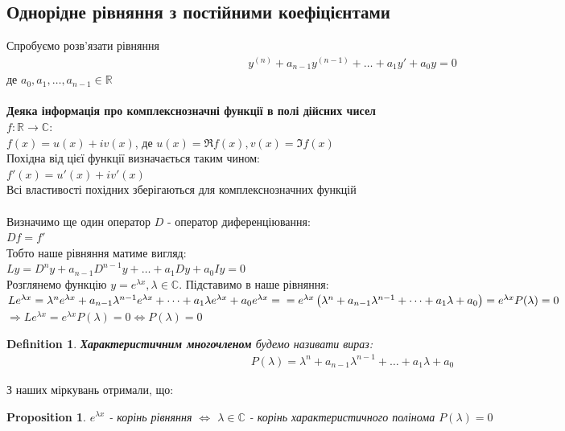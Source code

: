 \documentclass[a4paper, 10pt]{article}
\theoremstyle{theoremdd}
\theoremstyle{theoremdd}
\newtheorem{definition}[theorem]{Definition}
\theoremstyle{theoremdd}
\theoremstyle{theoremdd}
\theoremstyle{theoremdd}
\newtheorem{proposition}[theorem]{Proposition}
\theoremstyle{theoremdd}
\theoremstyle{theoremdd}
\theoremstyle{theoremdd}
\begin{document}
\subsection{Однорідне рівняння з постійними коефіцієнтами}
Спробуємо розв'язати рівняння
\begin{align*}
y^{(n)} + a_{n-1}y^{(n-1)}+\dots+a_1y'+a_0y = 0
\end{align*}
де $a_0, a_1,\dots,a_{n-1} \in \mathbb{R}$\\
\\ 
\textbf{Деяка інформація про комплекснозначні функції в полі дійсних чисел}\\
$f: \mathbb{R} \rightarrow \mathbb{C}:$\\
$f(x) = u(x) + iv(x)$, де $u(x) = \Re f(x), v(x) = \Im f(x)$\\
Похідна від цієї функції визначається таким чином:\\
$f'(x) = u'(x) + iv'(x)$\\
Всі властивості похідних зберігаються для комплекснозначних функцій
\\
\\
Визначимо ще один оператор $D$ - оператор диференціювання:\\
$Df = f'$\\
Тобто наше рівняння матиме вигляд:\\
$Ly = D^n y + a_{n-1}D^{n-1} y + \dots + a_1Dy + a_0Iy = 0$\\
Розглянемо функцію $\displaystyle y = e^{\lambda x}, \lambda \in \mathbb{C}$. Підставимо в наше рівняння:\\
$Le^{\lambda x} = \lambda^n e^{\lambda x} + a_{n-1} \lambda^{n-1} e^{\lambda x} + \dots + a_1 \lambda e^{\lambda x} + a_0 e^{\lambda x} = \\ = e^{\lambda x} \left( \lambda^n + a_{n-1} \lambda^{n-1} + \dots + a_1 \lambda + a_0 \right) = e^{\lambda x} P(\lambda) = 0$\\
$\Rightarrow Le^{\lambda x} = e^{\lambda x} P(\lambda) = 0 \iff P(\lambda) = 0$\\
\begin{definition}
 \textbf{Характеристичним многочленом} будемо називати вираз:
\begin{align*}
P(\lambda) = \lambda^n + a_{n-1} \lambda^{n-1} + \dots + a_1 \lambda + a_0
\end{align*}
\end{definition}
З наших міркувань отримали, що:\\
	\begin{proposition}
 $\displaystyle e^{\lambda x}$ - корінь рівняння $\iff$ $\lambda \in \mathbb{C}$ - корінь характеристичного полінома $P(\lambda) = 0$
	\end{proposition}
\end{document}
